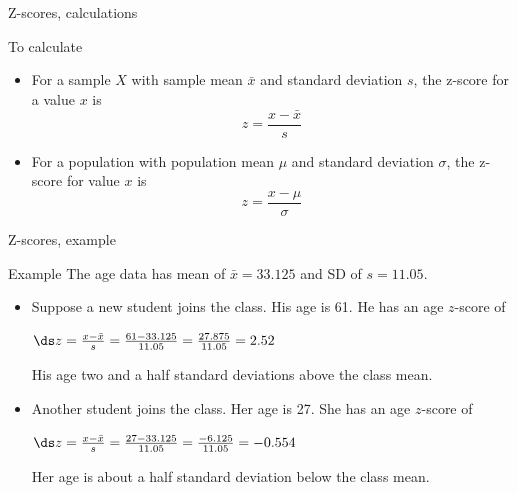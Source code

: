 \documentclass[xcolor=table]{beamer}
\begin{document}
\begin{frame}{Z-scores, calculations}
\begin{block}{To calculate}
\begin{itemize}
\item For a sample $X$ with sample mean $\bar x$ and standard deviation $s$, the z-score for a value $x$ is
\[z = \frac{x - \bar x}{s}\]
\smallskip
\pause
\item For a population with population mean $\mu$ and standard deviation $\sigma$, the z-score for value $x$ is
\[z = \frac{x - \mu}{\sigma}\]
\end{itemize} 
\end{block}
\end{frame}

\begin{frame}{Z-scores, example}
\begin{exampleblock}{Example}
The age data has mean of $\bar x = 33.125$ and SD of $s=11.05$.
\begin{itemize}
\pause
\item Suppose a new student joins the class. His age is 61. He has an age $z$-score of\\
\smallskip
{\centering
$\ds z = \frac{x - \bar x}{s} = \frac {61-33.125}{11.05} = \frac {27.875}{11.05} = 2.52$
\par}
\medskip
\pause
His age two and a half standard deviations above the class mean.
\smallskip
\pause
\item Another student joins the class. Her age is 27. She has an age $z$-score of\\
\smallskip
{\centering
$\ds z = \frac{x - \bar x}{s} = \frac {27-33.125}{11.05} = \frac {-6.125}{11.05} = -0.554$
\par}
\medskip
\pause
Her age is about a half standard deviation below the class mean.
\end{itemize}

\end{exampleblock}
\end{frame}
\end{document}
